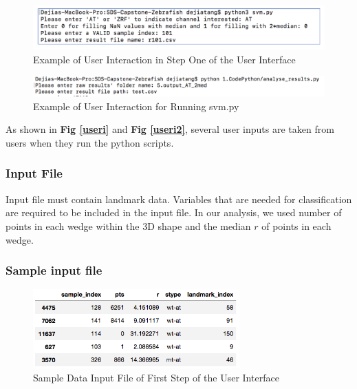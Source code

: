 \documentclass[10pt,letterpaper]{article}
\begin{document}
\begin{figure}[h]

{\centering \includegraphics{figures/Figure2} 

}

\caption{\label{useri} Example of User Interaction in Step One of the User Interface}\label{fig:unnamed-chunk-5}
\end{figure}

\begin{figure}[h]
\includegraphics[width=5.03in]{figures/Figure4} \caption{\label{useri2} Example of User Interaction for Running svm.py}\label{fig:unnamed-chunk-6}
\end{figure}

As shown in \textbf{Fig \ref{useri}} and \textbf{Fig \ref{useri2}},
several user inputs are taken from users when they run the python
scripts.

\subsubsection{Input File}\label{input-file}

Input file must contain landmark data. Variables that are needed for
classification are required to be included in the input file. In our
analysis, we used number of points in each wedge within the 3D shape and
the median \(r\) of points in each wedge.

\subsubsection{Sample input file}\label{sample-input-file}

\begin{figure}[h]

{\centering \includegraphics[width=300px]{figures/Figure3} 

}

\caption{\label{inputdata} Sample Data Input File of First Step of the User Interface}\label{fig:unnamed-chunk-7}
\end{figure}
\end{document}
